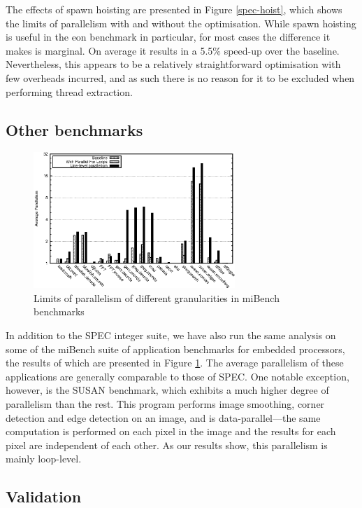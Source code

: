 The effects of spawn hoisting are presented in Figure \ref{spec-hoist}, which shows the limits of parallelism with and without the optimisation.
While spawn hoisting is useful in the eon benchmark in particular, for most cases the difference it makes is marginal.
On average it results in a 5.5\% speed-up over the baseline.
Nevertheless, this appears to be a relatively straightforward optimisation with few overheads incurred, and as such there is no reason for it to be excluded when performing thread extraction.

\subsection{Other benchmarks}

\begin{figure}
 \centering
 \includegraphics[width=3in]{mb-gran}
 \caption{Limits of parallelism of different granularities in miBench benchmarks}
 \label{mb-gran}
\end{figure}

In addition to the SPEC integer suite, we have also run the same analysis on some of the miBench \cite{guthaus01mibench} suite of application benchmarks for embedded processors, the results of which are presented in Figure \ref{mb-gran}.
The average parallelism of these applications are generally comparable to those of SPEC.
One notable exception, however, is the SUSAN benchmark, which exhibits a much higher degree of parallelism than the rest.
This program performs image smoothing, corner detection and edge detection on an image, and is data-parallel---the same computation is performed on each pixel in the image and the results for each pixel are independent of each other.
As our results show, this parallelism is mainly loop-level.

\subsection{Validation}

